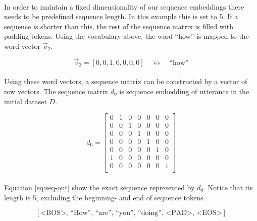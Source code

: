 \documentclass{article}
\begin{document}
\paragraph{}
In order to maintain a fixed dimensionality of our sequence embeddings there
needs to be predefined sequence length. In this example this is set to 5. If a
sequence is shorter than this, the rest of the sequence matrix is filled with
padding tokens. Using the vocabulary above, the word ``how'' is mapped to the
word vector $\vec{v}_2$.

\begin{equation}
  \vec{v}_2 = [0, 0, 1, 0, 0, 0, 0] \quad {\leftrightarrow} \quad \textrm{``how''}
\end{equation}

\paragraph{}
Using these word vectors, a sequence matrix can be constructed by a vector of
row vectors. The sequence matrix $d_0$ is sequence embedding of utterance in
the initial dataset $D$.

\begin{equation}
  d_{0} = 
    \begin{bmatrix}
      0 & 1 & 0 & 0 & 0 & 0 & 0\\
      0 & 0 & 1 & 0 & 0 & 0 & 0\\
      0 & 0 & 0 & 1 & 0 & 0 & 0\\
      0 & 0 & 0 & 0 & 1 & 0 & 0\\
      0 & 0 & 0 & 0 & 0 & 1 & 0\\
      1 & 0 & 0 & 0 & 0 & 0 & 0\\
      0 & 0 & 0 & 0 & 0 & 0 & 1\\
    \end{bmatrix}
\end{equation}

\paragraph{}
Equation \ref{eq:seq-out} show the exact sequence represented by $d_0$. Notice
that its length is 5, excluding the beginning- and end of sequence tokens.

\begin{equation} \label{eq:seq-out}
  [ \textrm{<BOS>},\, \textrm{``How''},\, \textrm{``are''},\, \textrm{``you''},\,
    \textrm{``doing''},\, \textrm{<PAD>},\, \textrm{<EOS>} ]
\end{equation}
\end{document}
